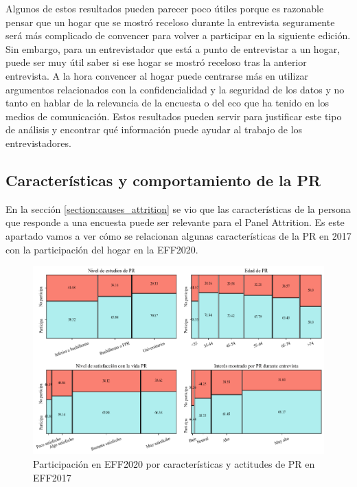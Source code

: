 Algunos de estos resultados pueden parecer poco útiles porque es razonable pensar que un hogar que se mostró receloso durante la entrevista seguramente será más complicado de convencer para volver a participar en la siguiente edición. Sin embargo, para un entrevistador que está a punto de entrevistar a un hogar, puede ser muy útil saber si ese hogar se mostró receloso tras la anterior entrevista. A la hora convencer al hogar puede centrarse más en utilizar argumentos relacionados con la confidencialidad y la seguridad de los datos y no tanto en hablar de la relevancia de la encuesta o del eco que ha tenido en los medios de comunicación. Estos resultados pueden servir para justificar este tipo de análisis y encontrar qué información puede ayudar al trabajo de los entrevistadores.

\subsection*{Características y comportamiento de la PR}

En la sección \ref{section:causes_attrition} se vio que las características de la persona que responde a una encuesta puede ser relevante para el Panel Attrition. Es este apartado vamos a ver cómo se relacionan algunas características de la PR en 2017 con la participación del hogar en la EFF2020.

\begin{figure}[ht]
	\centering
	\includegraphics[width=1\textwidth]{figs/figure2.png}
	\caption{Participación en EFF2020 por características y actitudes de PR en EFF2017}
	\label{fig:fig2}
\end{figure}

